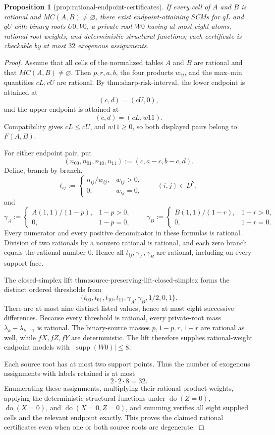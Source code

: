 \documentclass{article}
\newtheorem{proposition}{Proposition}
\begin{document}
\begin{proposition}[prop:rational-endpoint-certificates]\label{prop:rational-endpoint-certificates}
If every cell of \(A\) and \(B\) is rational and \(MC(A,B)\neq\varnothing\), there exist endpoint-attaining SCMs for \(qL\) and \(qU\) with binary roots \(U0,V0\), a private root \(W0\) having at most eight atoms, rational root weights, and deterministic structural functions; each certificate is checkable by at most \(32\) exogenous assignments.
\end{proposition}
\begin{proof}
Assume that all cells of the normalized tables \(A\) and \(B\) are rational and that \(MC(A,B)\ne\varnothing\).  Then \(p,r,a,b\), the four products \(w_{ij}\), and the max--min quantities \(cL,cU\) are rational.  By \(\text{thm:sharp-risk-interval}\), the lower endpoint is attained at
\[
(c,d)=(cU,0),
\]
and the upper endpoint is attained at
\[
(c,d)=(cL,w11).
\]
Compatibility gives \(cL\le cU\), and \(w11\ge0\), so both displayed pairs belong to \(F(A,B)\).

For either endpoint pair, put
\[
(n_{00},n_{01},n_{10},n_{11}):=(c,a-c,b-c,d).
\]
Define, branch by branch,
\[
t_{ij}:=
\begin{cases}
n_{ij}/w_{ij},&w_{ij}>0,\\
0,&w_{ij}=0,
\end{cases}
\qquad (i,j)\in D^2,
\]
and
\[
\gamma_A:=
\begin{cases}
A(1,1)/(1-p),&1-p>0,\\
0,&1-p=0,
\end{cases}
\qquad
\gamma_B:=
\begin{cases}
B(1,1)/(1-r),&1-r>0,\\
0,&1-r=0.
\end{cases}
\]
Every numerator and every positive denominator in these formulas is rational.  Division of two rationals by a nonzero rational is rational, and each zero branch equals the rational number \(0\).  Hence all \(t_{ij},\gamma_A,\gamma_B\) are rational, including on every support face.

The closed-simplex lift \(\text{thm:source-preserving-lift-closed-simplex}\) forms the distinct ordered thresholds from
\[
\{t_{00},t_{01},t_{10},t_{11},\gamma_A,\gamma_B,1/2,0,1\}.
\]
There are at most nine distinct listed values, hence at most eight successive differences.  Because every threshold is rational, every private-root mass \(\lambda_k-\lambda_{k-1}\) is rational.  The binary-source masses \(p,1-p,r,1-r\) are rational as well, while \(fX,fZ,fY\) are deterministic.  The lift therefore supplies rational-weight endpoint models with \(|\operatorname{supp}(W0)|\le8\).

Each source root has at most two support points.  Thus the number of exogenous assignments with labels retained is at most
\[
2\cdot2\cdot8=32.
\]
Enumerating these assignments, multiplying their rational product weights, applying the deterministic structural functions under \(\operatorname{do}(Z=0)\), \(\operatorname{do}(X=0)\), and \(\operatorname{do}(X=0,Z=0)\), and summing verifies all eight supplied cells and the relevant endpoint exactly.  This proves the claimed rational certificates even when one or both source roots are degenerate.
\end{proof}
\end{document}
